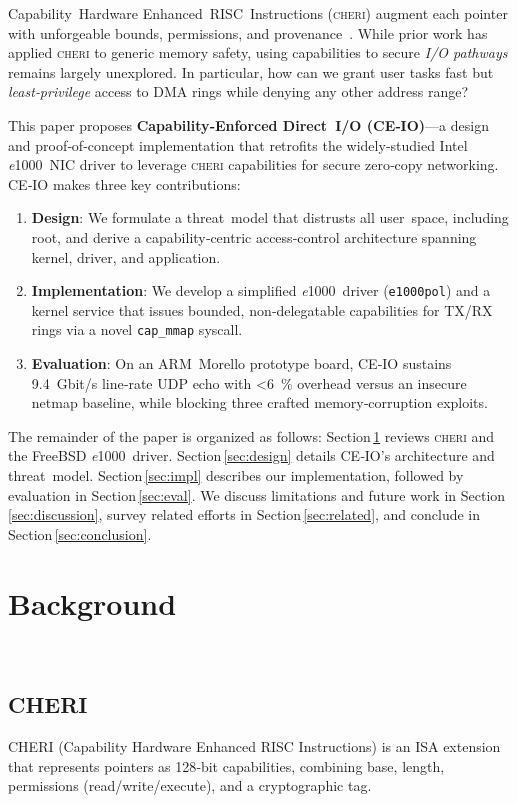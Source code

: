 \documentclass[sigconf]{acmart}
\newcommand{\cheri}{\textsc{cheri}\xspace}
\newcommand{\e}{\textit{e}1000\xspace}
\begin{document}
Capability Hardware Enhanced RISC Instructions (\cheri) augment each pointer with unforgeable bounds, permissions, and provenance \cite{woodruff2019cheri}. While prior work has applied \cheri to generic memory safety, using capabilities to secure \emph{I/O pathways} remains largely unexplored. In particular, how can we grant user tasks fast but \textit{least‑privilege} access to DMA rings while denying any other address range?  

This paper proposes \textbf{Capability‑Enforced Direct I/O (CE‑IO)}—a design and proof‑of‑concept implementation that retrofits the widely‑studied Intel \e NIC driver to leverage \cheri capabilities for secure zero‑copy networking. CE‑IO makes three key contributions:  
\begin{enumerate}
    \item \textbf{Design}: We formulate a threat model that distrusts all user space, including root, and derive a capability‑centric access‑control architecture spanning kernel, driver, and application.  
    \item \textbf{Implementation}: We develop a simplified \e driver (\texttt{e1000pol}) and a kernel service that issues bounded, non‑delegatable capabilities for TX/RX rings via a novel \texttt{cap\_mmap} syscall.  
    \item \textbf{Evaluation}: On an ARM Morello prototype board, CE‑IO sustains 9.4 Gbit/s line‑rate UDP echo with \textless6 \% overhead versus an insecure netmap baseline, while blocking three crafted memory‑corruption exploits.  
\end{enumerate}

\noindent The remainder of the paper is organized as follows: Section\,\ref{sec:background} reviews \cheri and the FreeBSD \e driver. Section\,\ref{sec:design} details CE‑IO’s architecture and threat model. Section\,\ref{sec:impl} describes our implementation, followed by evaluation in Section\,\ref{sec:eval}. We discuss limitations and future work in Section\,\ref{sec:discussion}, survey related efforts in Section\,\ref{sec:related}, and conclude in Section\,\ref{sec:conclusion}.

\section{Background}
\label{sec:background}
\
\subsection{CHERI}
CHERI (Capability Hardware Enhanced RISC Instructions) is an ISA extension that represents pointers as 128‑bit capabilities, combining base, length, permissions (read/write/execute), and a cryptographic tag. 
\end{document}
